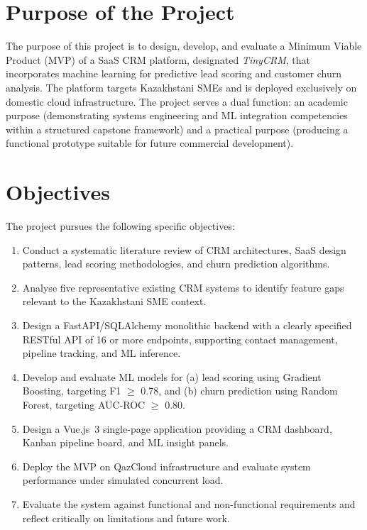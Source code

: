\section{Purpose of the Project}

The purpose of this project is to design, develop, and evaluate a Minimum
Viable Product (MVP) of a SaaS CRM platform, designated \textit{TinyCRM},
that incorporates machine learning for predictive lead scoring and customer
churn analysis. The platform targets Kazakhstani SMEs and is deployed
exclusively on domestic cloud infrastructure. The project serves a dual
function: an academic purpose (demonstrating systems engineering and ML
integration competencies within a structured capstone framework) and a
practical purpose (producing a functional prototype suitable for future
commercial development).

\section{Objectives}

The project pursues the following specific objectives:

\begin{enumerate}[label=\textbf{O\arabic*.}]
  \item Conduct a systematic literature review of CRM architectures, SaaS
  design patterns, lead scoring methodologies, and churn prediction
  algorithms.

  \item Analyse five representative existing CRM systems to identify
  feature gaps relevant to the Kazakhstani SME context.

  \item Design a FastAPI/SQLAlchemy monolithic backend with a clearly
  specified RESTful API of 16 or more endpoints, supporting contact
  management, pipeline tracking, and ML inference.

  \item Develop and evaluate ML models for (a) lead scoring using Gradient
  Boosting, targeting F1 $\geq$ 0.78, and (b) churn prediction using
  Random Forest, targeting AUC-ROC $\geq$ 0.80.

  \item Design a Vue.js~3 single-page application providing a CRM
  dashboard, Kanban pipeline board, and ML insight panels.

  \item Deploy the MVP on QazCloud infrastructure and evaluate system
  performance under simulated concurrent load.

  \item Evaluate the system against functional and non-functional
  requirements and reflect critically on limitations and future work.
\end{enumerate}

